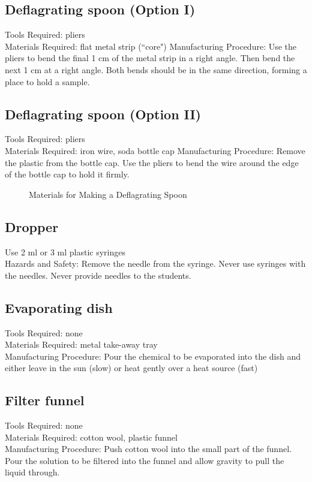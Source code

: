 \subsection*{Deflagrating spoon (Option I)}
Tools Required: pliers\\
Materials Required: flat metal strip (``core")
Manufacturing Procedure: Use the pliers to bend the final 1 cm of the metal strip in a right angle. Then bend the next 1 cm at a right angle. Both bends should be in the same direction, forming a place to hold a sample.



\subsection*{Deflagrating spoon (Option II)}
Tools Required: pliers\\
Materials Required: iron wire, soda bottle cap
Manufacturing Procedure: Remove the plastic from the bottle cap. Use the pliers to bend the wire around the edge of the bottle cap to hold it firmly.



\begin{figure}[h]
\begin{center}
\def\svgwidth{50pt}

\caption{Materials for Making a Deflagrating Spoon}
\end{center}
\end{figure}

\subsection*{Dropper}
Use 2 ml or 3 ml plastic syringes
\\Hazards and Safety: Remove the needle from the syringe. Never use syringes with the needles. Never provide needles to the students.

\subsection*{Evaporating dish}
Tools Required: none\\
Materials Required: metal take-away tray\\
Manufacturing Procedure: Pour the chemical to be evaporated into the dish and either leave in the sun (slow) or heat gently over a heat source (fast)

\subsection*{Filter funnel}
Tools Required: none\\
Materials Required: cotton wool, plastic funnel\\
Manufacturing Procedure: Push cotton wool into the small part of the funnel. Pour the solution to be filtered into the funnel and allow gravity to pull the liquid through.

